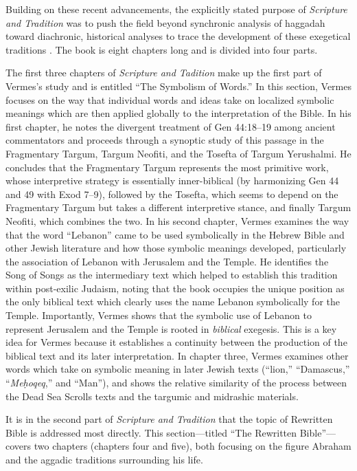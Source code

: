 Building on these recent advancements, the explicitly stated purpose of
\emph{Scripture and Tradition} was to push the field beyond synchronic
analysis of haggadah toward diachronic, historical analyses to trace the
development of these exegetical traditions \autocites[1]{vermes1961}[See
also][]{bloch1955_repr}. The book is eight chapters long and is divided
into four parts.

The first three chapters of \emph{Scripture and Tadition} make up the
first part of Vermes's study and is entitled ``The Symbolism of Words.''
In this section, Vermes focuses on the way that individual words and
ideas take on localized symbolic meanings which are then applied
globally to the interpretation of the Bible. In his first chapter, he
notes the divergent treatment of Gen 44:18--19 among ancient
commentators and proceeds through a synoptic study of this passage in
the Fragmentary Targum, Targum Neofiti, and the Tosefta of Targum
Yerushalmi. He concludes that the Fragmentary Targum represents the most
primitive work, whose interpretive strategy is essentially
inner-biblical (by harmonizing Gen 44 and 49 with Exod 7--9), followed
by the Tosefta, which seems to depend on the Fragmentary Targum but
takes a different interpretive stance, and finally Targum Neofiti, which
combines the two. In his second chapter, Vermes examines the way that
the word ``Lebanon'' came to be used symbolically in the Hebrew Bible
and other Jewish literature and how those symbolic meanings developed,
particularly the association of Lebanon with Jerusalem and the Temple.
He identifies the Song of Songs as the intermediary text which helped to
establish this tradition within post-exilic Judaism, noting that the
book occupies the unique position as the only biblical text which
clearly uses the name Lebanon symbolically for the Temple. Importantly,
Vermes shows that the symbolic use of Lebanon to represent Jerusalem and
the Temple is rooted in \emph{biblical} exegesis. This is a key idea for
Vermes because it establishes a continuity between the production of the
biblical text and its later interpretation. In chapter three, Vermes
examines other words which take on symbolic meaning in later Jewish
texts (``lion,'' ``Damascus,'' ``\emph{Meḥoqeq},'' and ``Man''), and
shows the relative similarity of the process between the
Dead Sea Scrolls texts and the targumic and midrashic materials.

It is in the second part of \emph{Scripture and Tradition} that the
topic of Rewritten Bible is addressed most directly. This
section---titled ``The Rewritten Bible''---covers two chapters (chapters
four and five), both focusing on the figure Abraham and the aggadic
traditions surrounding his life.

